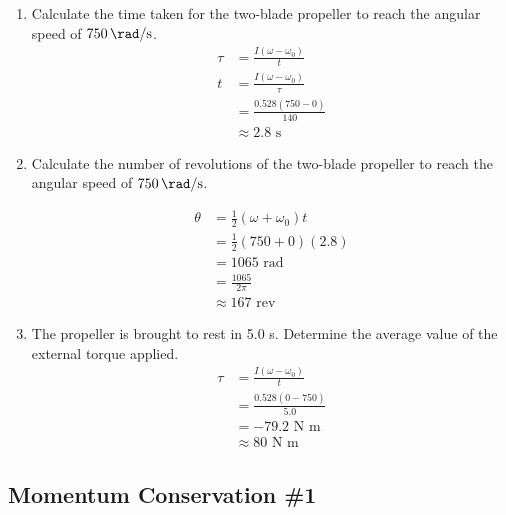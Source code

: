 \documentclass[a4paper,12pt]{article}
\begin{document}
\begin{enumerate}[label=(\alph*)]
        \begin{enumerate}[label=(\roman*)]
          \item Calculate the time taken for the two-blade propeller to reach the angular speed of $\SI{750}{\rad\per\s}$.
                \begin{align*}
                  \tau & = \frac{I(\omega - \omega_0)}{t}    \\
                  t    & = \frac{I(\omega - \omega_0)}{\tau} \\
                       & = \frac{0.528(750 - 0)}{140}        \\
                       & \approx 2.8 \text{ s}
                \end{align*}
          \item Calculate the number of revolutions of the two-blade propeller to reach the angular speed of $\SI{750}{\rad\per\s}$.

                \begin{align*}
                  \theta & = \frac{1}{2}(\omega + \omega_0)t \\
                         & = \frac{1}{2}(750 + 0)(2.8)       \\
                         & = 1065 \text{ rad}                \\
                         & = \frac{1065}{2\pi}               \\
                         & \approx 167 \text{ rev}
                \end{align*}
          \item The propeller is brought to rest in 5.0 s. Determine the average value of the external torque applied.
                \begin{align*}
                  \tau & = \frac{I(\omega - \omega_0)}{t} \\
                       & = \frac{0.528(0 - 750)}{5.0}     \\
                       & = -79.2 \text{ N m}              \\
                       & \approx 80 \text{ N m}
                \end{align*}
        \end{enumerate}
\end{enumerate}

\pagebreak

\subsection{Momentum Conservation \#1}
\end{document}
